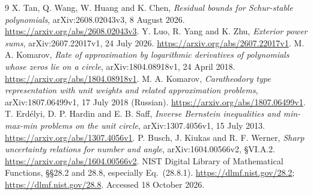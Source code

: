 \documentclass[11pt]{article}
\theoremstyle{remark}\newtheorem{remark}[theorem]{Remark}
\begin{document}
\begin{thebibliography}{9}
X. Tan, Q. Wang, W. Huang and K. Chen,
\emph{Residual bounds for Schur-stable polynomials},
arXiv:2608.02043v3, 8 August 2026.
\url{https://arxiv.org/abs/2608.02043v3}.
Y. Luo, R. Yang and K. Zhu,
\emph{Exterior power sums},
arXiv:2607.22017v1, 24 July 2026.
\url{https://arxiv.org/abs/2607.22017v1}.
M. A. Komarov,
\emph{Rate of approximation by logarithmic derivatives of polynomials
whose zeros lie on a circle}, arXiv:1804.08918v1, 24 April 2018.
\url{https://arxiv.org/abs/1804.08918v1}.
M. A. Komarov,
\emph{Caratheodory type representation with unit weights and related
approximation problems}, arXiv:1807.06499v1, 17 July 2018 (Russian).
\url{https://arxiv.org/abs/1807.06499v1}.
T. Erd\'elyi, D. P. Hardin and E. B. Saff,
\emph{Inverse Bernstein inequalities and min-max-min problems on
the unit circle}, arXiv:1307.4056v1, 15 July 2013.
\url{https://arxiv.org/abs/1307.4056v1}.
P. Busch, J. Kiukas and R. F. Werner,
\emph{Sharp uncertainty relations for number and angle},
arXiv:1604.00566v2, \S VI.A.2.
\url{https://arxiv.org/abs/1604.00566v2}.
NIST Digital Library of Mathematical Functions,
\S\S28.2 and 28.8, especially Eq.~(28.8.1).
\url{https://dlmf.nist.gov/28.2}; \url{https://dlmf.nist.gov/28.8}.
Accessed 18 October 2026.
\end{thebibliography}
\end{document}
